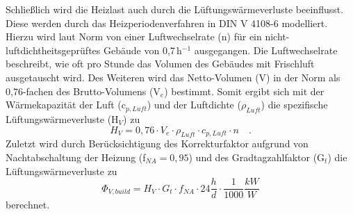 Schließlich wird die Heizlast auch durch die Lüftungswärmeverluste beeinflusst.
Diese werden durch das Heizperiodenverfahren in DIN V 4108-6 modelliert.
Hierzu wird laut Norm von einer Luftwechselrate (n) für ein nicht-luftdichtheitsgeprüftes Gebäude von 0,7\,h\(^{-1}\) ausgegangen. 
Die Luftwechselrate beschreibt, wie oft pro Stunde das Volumen des Gebäudes mit Frischluft ausgetauscht wird.
Des Weiteren wird das Netto-Volumen (V) in der Norm als 0,76-fachen des Brutto-Volumens (V\(_e\)) bestimmt.
Somit ergibt sich mit der Wärmekapazität der Luft (c\(_{p, Luft}\)) und der Luftdichte (\(\rho_{Luft}\)) die spezifische Lüftungswärmeverluste (H\(_V\)) zu
\begin{equation}
\label{eq:Gleichung2628}
H_V = 0,76 \cdot V_e \cdot \rho_{Luft} \cdot c_{p, Luft} \cdot n \quad \text{.}
\end{equation}
Zuletzt wird durch Berücksichtigung des Korrekturfaktor aufgrund von Nachtabschaltung der Heizung (f\(_{NA} = 0,95\)) und des Gradtagzahlfaktor (G\(_t\)) die Lüftungswärmeverluste zu
\begin{equation}
\label{eq:Gleichung2629}
\Phi_{V, build} = H_V \cdot G_t \cdot f_{NA} \cdot 24 \frac{h}{d} \cdot \frac{1}{1000} \frac{kW}{W} 
\end{equation}
berechnet.
